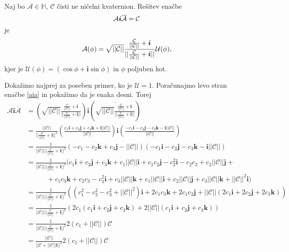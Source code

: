 \documentclass[mat1]{fmfdelo}
\newcommand{\HH}{\mathbb H}
\newcommand{\ii}{\boldsymbol i}
\newcommand{\jj}{\boldsymbol j}
\newcommand{\kk}{\boldsymbol k}
\newcommand{\A}{\mathcal A}
\newcommand{\CC}{\mathcal C}
\begin{document}
\begin{trditev}
	Naj bo $\A \in \HH$, $\CC$ čisti ne ničelni kvaternion. Rešitev enačbe 
	\begin{equation}{\label{aia}}
		\A \ii \overline{\A} = \CC
	\end{equation}
	 je
	\begin{equation}{\label{kvat_resitev}}
		\A(\phi) = \sqrt{||\CC||} \frac{\frac{\CC}{||\CC||} + \ii}{||\frac{\CC}{||\CC||} + \ii||} \mathcal{U}(\phi),
	\end{equation}
	kjer je $\mathcal{U}(\phi) = (\cos\phi + \ii \sin \phi)$ in $\phi$ poljuben kot.
\end{trditev}
\begin{dokaz}
	Dokažimo najprej za poseben primer, ko je $\mathcal{U} = 1$.
	Poračunajmo levo stran enačbe \ref{aia} in pokažimo da je enaka desni.
	Torej
	\begin{equation*}
				\begin{split}
				\A \ii \overline{\A} &= \left(\sqrt{||\CC||} \frac{\frac{\CC}{||\CC||} + \ii}{||\frac{\CC}{||\CC||} + \ii||}\right) \ii \left(\overline{\sqrt{||\CC||} \frac{\frac{\CC}{||\CC||} + \ii}{||\frac{\CC}{||\CC||} + \ii||}}\right) \\
		&= \frac{||\CC||}{||\frac{\CC}{||\CC||} + \ii||^2} \left(\frac{c_1 \ii + c_2 \jj + c_3 \kk + \ii ||\CC||}{||\CC||}\right)\ii \left(\frac{-c_1\ii-c_2\jj-c_3\kk-\ii||\CC||}{||\CC||}\right) \\
		&= \frac{1}{||\CC||||\frac{\CC}{||\CC||} + \ii||^2} \left(-c_1  - c_2 \kk + c_3 \jj -  ||\CC||\right) \left(-c_1\ii-c_2\jj-c_3\kk-\ii||\CC||\right) \\
		&=\frac{1}{||\CC||||\frac{\CC}{||\CC||} + \ii||^2} ( c_1\ii + c_2\jj + c_3\kk + c_1||\CC||\ii
		+c_1c_2\jj-c_2^2\ii-c_2c_3+c_2||\CC||\jj+\\
		&\quad\quad\quad+c_1c_3\kk+c_2c_3-c_3^2\ii+c_3||\CC||\kk+c_1||\CC||\ii+c_2||\CC||\jj+c_3||\CC||\kk+||\CC||^2\ii )\\
		&=\frac{1}{||\CC||||\frac{\CC}{||\CC||} + \ii||^2}\left((c_1^2-c_2^2-c_3^2+||\CC||^2)\ii + 2c_1c_3\kk+2c_1c_2\jj + ||\CC||(2c_1\ii+2c_2\jj+2c_3\kk)\right)\\
		&=\frac{1}{||\CC||||\frac{\CC}{||\CC||} + \ii||^2}\left(2c_1(c_1\ii+c_2\jj+c_3\kk) + 2||\CC||(c_1\ii+c_2\jj+c_3\kk)\right)\\
		&=\frac{1}{||\CC||||\frac{\CC}{||\CC||} + \ii||^2}2(c_1+||\CC||)\CC \\
		&=\frac{||\CC||}{||\CC + ||\CC||\ii||^2}2(c_1+||\CC||)\CC \\

\end{split}
\end{equation*}
\end{dokaz}
\end{document}
